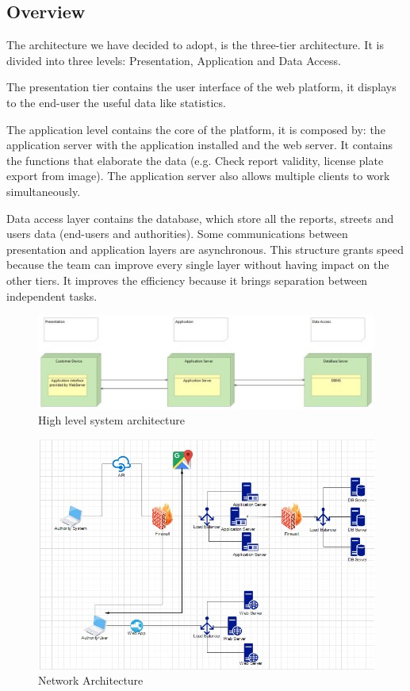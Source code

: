 \subsection{Overview}
The architecture we have decided to adopt, is the three-tier architecture.
It is divided into three levels: Presentation, Application and Data Access.

The presentation tier contains the user interface of the web platform, it displays to the end-user the useful data like statistics.

The application level contains the core of the platform, it is composed by: the application server with the application installed and the web server.
It contains the functions that elaborate the data (e.g. Check report validity, license plate export from image).
The application server also allows multiple clients to work simultaneously.

Data access layer contains the database, which store all the reports, streets and users data (end-users and authorities).
Some communications between presentation and application layers are asynchronous.
This structure grants speed because the team can improve every single layer without having impact on the other tiers.
It improves the efficiency because it brings separation between independent tasks.

\begin{figure}[H]
	\includegraphics[width=0.95\linewidth, height=0.20\textheight]{../DD/Images/architecture}
	\caption{High level system architecture}
	\label{fig: high­ level system architecture}
\end{figure}
\newpage
\begin{figure}[H]
	\centering
	\includegraphics[width=0.98\linewidth]{Images/networkarchitecture}
	\caption{Network Architecture}
	\label{fig:networkarchitecture}
\end{figure}

